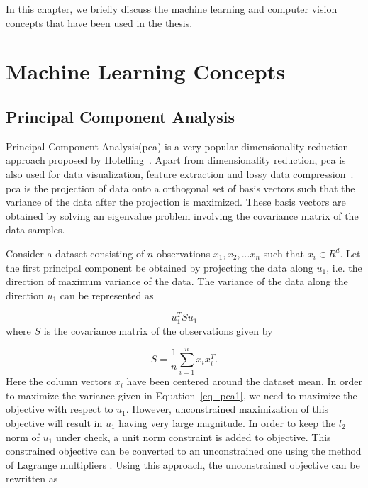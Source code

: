 In this chapter, we briefly discuss the machine learning and computer vision concepts that have been used in the thesis.
\section{Machine Learning Concepts}
\label{sec_machine_learning_tools}

\subsection{Principal Component Analysis}
\label{subsec_pca}

Principal Component Analysis({\sc pca}) is a very popular dimensionality reduction approach proposed by Hotelling~\cite{hotelling}. Apart from dimensionality reduction, {\sc pca} is also used for data visualization, feature extraction and lossy data compression~\cite{prml}. 
{\sc pca} is the projection of data onto a orthogonal set of basis vectors such that the variance of the data after the projection is maximized. These basis vectors are obtained by solving an eigenvalue problem involving the covariance matrix of the data samples.

Consider a dataset consisting of $n$ observations ${x_1, x_2, ...x_n}$ such that $x_i \in R^d$. Let the first principal component be obtained by projecting the data along $u_1$, i.e. the direction of maximum variance of the data. The variance of the data along the direction $u_1$ can be represented as 

\begin{equation}\label{eq_pca1}
u_1^TSu_1
\end{equation} 
where $S$ is the covariance matrix of the observations given by

\begin{equation}\label{eq_pca2}
S= \frac{1}{n} \sum \limits_{i=1}^{n} x_i x_i^T.
\end{equation} 
Here the column vectors $x_i$ have been centered around the dataset mean. In order to maximize the variance given in Equation~\ref{eq_pca1}, we need to maximize the objective with respect to $u_1$. However, unconstrained maximization of this objective will result in $u_1$ having very large magnitude. In order to keep the $l_2$ norm of $u_1$ under check, a unit norm constraint is added to objective. This constrained objective can be converted to an unconstrained one using the method of Lagrange multipliers . Using this approach, the unconstrained objective can be rewritten as

